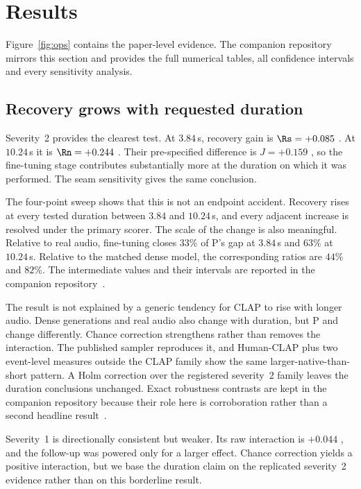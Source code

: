 \section{Results}
\label{sec:results}
Figure~\ref{fig:ops} contains the paper-level evidence. The companion repository mirrors this section and provides the full numerical tables, all confidence intervals and every sensitivity analysis.

\subsection{Recovery grows with requested duration}
Severity~2 provides the clearest test. At $3.84$\,s, recovery gain is $\Rs=+0.085$ . At $10.24$\,s it is $\Rn=+0.244$ . Their pre-specified difference is $J=+0.159$ , so the fine-tuning stage contributes substantially more at the duration on which it was performed. The seam sensitivity gives the same conclusion.

The four-point sweep shows that this is not an endpoint accident. Recovery rises at every tested duration between $3.84$ and $10.24$\,s, and every adjacent increase is resolved under the primary scorer. The scale of the change is also meaningful. Relative to real audio, fine-tuning closes $33\%$ of P's gap at $3.84$\,s and $63\%$ at $10.24$\,s. Relative to the matched dense model, the corresponding ratios are $44\%$ and $82\%$. The intermediate values and their intervals are reported in the companion repository~\cite{bibbo2026repo}.

The result is not explained by a generic tendency for CLAP to rise with longer audio. Dense generations and real audio also change with duration, but P and \PFT{} change differently. Chance correction strengthens rather than removes the interaction. The published sampler reproduces it, and Human-CLAP plus two event-level measures outside the CLAP family show the same larger-native-than-short pattern. A Holm correction over the registered severity~2 family leaves the duration conclusions unchanged. Exact robustness contrasts are kept in the companion repository because their role here is corroboration rather than a second headline result~\cite{bibbo2026repo}.

Severity~1 is directionally consistent but weaker. Its raw interaction is $+0.044$ , and the follow-up was powered only for a larger effect. Chance correction yields a positive interaction, but we base the duration claim on the replicated severity~2 evidence rather than on this borderline result.

